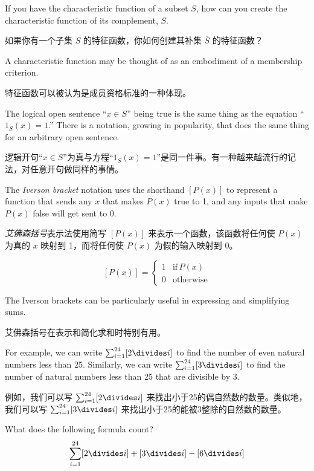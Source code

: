 \begin{exer}
If you have the characteristic function of a subset $S$, how can you
create the characteristic function of its complement, $\overline{S}$.
\end{exer}

\begin{exer}
如果你有一个子集 $S$ 的特征函数，你如何创建其补集 $\overline{S}$ 的特征函数？
\end{exer}

A characteristic function may be thought of as an embodiment of a
membership criterion.

特征函数可以被认为是成员资格标准的一种体现。

The logical open sentence ``$x \in S$'' being true
is the same thing as the equation ``$1_S(x) = 1$.''   There is a notation,
growing in popularity, that does the same thing for an arbitrary open sentence.

逻辑开句“$x \in S$”为真与方程“$1_S(x) = 1$”是同一件事。有一种越来越流行的记法，对任意开句做同样的事情。

The \emph{Iverson bracket} notation uses the 
shorthand $[ P(x) ]$ to represent a function that sends any $x$ that makes
$P(x)$ true to 1, and any inputs that make $P(x)$ false will get sent to 0.

\emph{艾佛森括号}表示法使用简写 $[ P(x) ]$ 来表示一个函数，该函数将任何使 $P(x)$ 为真的 $x$ 映射到 1，而将任何使 $P(x)$ 为假的输入映射到 0。

\[ [ P(x) ] = \left\{ \begin{array}{cl} 1 & \mbox{if} \, P(x) \\ 0 & \mbox{otherwise} \end{array} \right. \]
 
The Iverson brackets can be particularly useful in expressing and simplifying
sums.

艾佛森括号在表示和简化求和时特别有用。

For example, we can write $\sum_{i=1}^{24} [2 \divides i]$ to
find the number of even natural numbers less than 25.  Similarly, we can write
$\sum_{i=1}^{24} [3 \divides i]$ to find the number of natural numbers less than 
25 that are divisible by 3.  

例如，我们可以写 $\sum_{i=1}^{24} [2 \divides i]$ 来找出小于25的偶自然数的数量。类似地，我们可以写 $\sum_{i=1}^{24} [3 \divides i]$ 来找出小于25的能被3整除的自然数的数量。

\begin{exer}
What does the following formula count?
\[ \sum_{i=1}^{24} [2 \divides i] + [3 \divides i] - [6 \divides i] \]

\end{exer}

